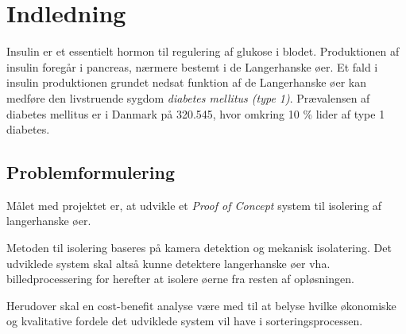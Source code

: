 \chapter{Indledning}
Insulin er et essentielt hormon til regulering af glukose i blodet. Produktionen af insulin foregår i pancreas, nærmere bestemt i de Langerhanske øer. Et fald i insulin produktionen grundet nedsat funktion af de Langerhanske øer kan medføre den livstruende sygdom \textit{diabetes mellitus (type 1)}. Prævalensen af diabetes mellitus er i Danmark på 320.545, hvor omkring 10 \% lider af type 1 diabetes. 









\section{Problemformulering}
Målet med projektet er, at udvikle et \textit{Proof of Concept} system til isolering af langerhanske øer.

Metoden til isolering baseres på kamera detektion og mekanisk isolatering. Det udviklede system skal altså kunne detektere langerhanske øer vha. billedprocessering for herefter at  isolere øerne fra resten af opløsningen. 

Herudover skal en cost-benefit analyse være med til at belyse hvilke økonomiske og kvalitative fordele det udviklede system vil have i sorteringsprocessen.

